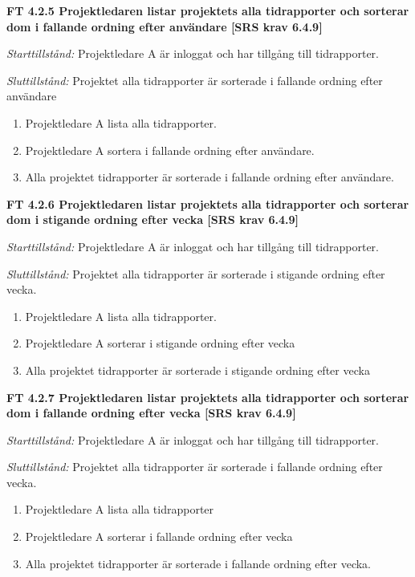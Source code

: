 \documentclass[a4paper]{article}
\begin{document}
\textbf{FT 4.2.5 Projektledaren listar projektets alla tidrapporter och sorterar dom i fallande ordning efter användare [SRS krav 6.4.9]}

\emph{Starttillstånd:} Projektledare A är inloggat och har tillgång till tidrapporter.

\emph{Sluttillstånd:} Projektet alla tidrapporter är sorterade i fallande ordning efter användare

\begin{enumerate}
\item Projektledare A lista alla tidrapporter.
\item Projektledare A sortera i fallande ordning efter användare.
\item Alla projektet tidrapporter är sorterade i fallande ordning efter användare.
\end{enumerate}

\textbf{FT 4.2.6 Projektledaren listar projektets alla tidrapporter och sorterar dom i stigande ordning efter vecka [SRS krav 6.4.9]}

\emph{Starttillstånd:} Projektledare A är inloggat och har tillgång till tidrapporter.

\emph{Sluttillstånd:} Projektet alla tidrapporter är sorterade i stigande ordning efter vecka.

\begin{enumerate}
\item Projektledare A lista alla tidrapporter.
\item Projektledare A sorterar i stigande ordning efter vecka
\item Alla projektet tidrapporter är sorterade i stigande ordning efter vecka
\end{enumerate}

\textbf{FT 4.2.7 Projektledaren listar projektets alla tidrapporter och sorterar dom i fallande ordning efter vecka [SRS krav 6.4.9]} 

\emph{Starttillstånd:} Projektledare A är inloggat och har tillgång till tidrapporter.

\emph{Sluttillstånd:} Projektet alla tidrapporter är sorterade i fallande ordning efter vecka.

\begin{enumerate}
\item Projektledare A lista alla tidrapporter
\item Projektledare A sorterar i fallande ordning efter vecka
\item Alla projektet tidrapporter är sorterade i fallande ordning efter vecka.
\end{enumerate}
\end{document}
